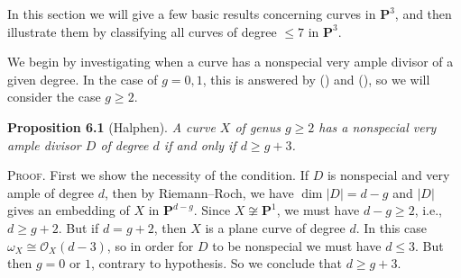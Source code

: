 {In this section we will give a few basic results concerning curves in $\mathbf P^3$, and then illustrate them by classifying all curves of degree $\le7$ in $\mathbf P^3$.

We begin by investigating when a curve has a nonspecial very ample divisor of a given degree. In the case of $g=0,1$, this is answered by () and (), so we will consider the case $g\ge2$.

\medskip
\noindent\hypertarget{result-IV-6.1}{}\textbf{Proposition 6.1} (Halphen). \emph{A curve $X$ of genus $g\ge2$ has a nonspecial very ample divisor $D$ of degree $d$ if and only if $d\ge g+3$.}

\smallskip
\noindent\textsc{Proof.} First we show the necessity of the condition. If $D$ is nonspecial and very ample of degree $d$, then by Riemann--Roch, we have $\dim|D|=d-g$ and $|D|$ gives an embedding of $X$ in $\mathbf P^{d-g}$. Since $X\not\cong\mathbf P^1$, we must have $d-g\ge2$, i.e., $d\ge g+2$. But if $d=g+2$, then $X$ is a plane curve of degree $d$. In this case $\omega_X\cong\mathcal O_X(d-3)$, so in order for $D$ to be nonspecial we must have $d\le3$. But then $g=0$ or $1$, contrary to hypothesis. So we conclude that $d\ge g+3$.}
